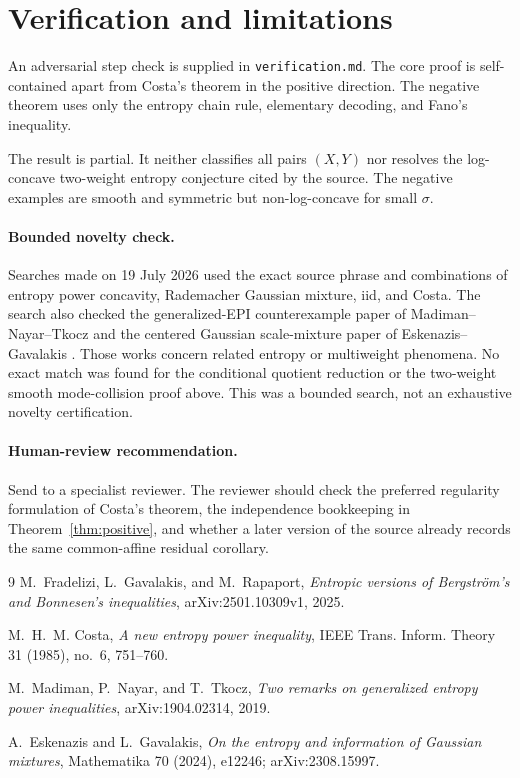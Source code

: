 \documentclass[11pt]{article}
\begin{document}
\section{Verification and limitations}

An adversarial step check is supplied in \texttt{verification.md}. The core
proof is self-contained apart from Costa's theorem in the positive direction.
The negative theorem uses only the entropy chain rule, elementary decoding,
and Fano's inequality.

The result is partial. It neither classifies all pairs $(X,Y)$ nor resolves
the log-concave two-weight entropy conjecture cited by the source. The
negative examples are smooth and symmetric but non-log-concave for small
$\sigma$.

\paragraph{Bounded novelty check.}
Searches made on 19 July 2026 used the exact source phrase and combinations of
entropy power concavity, Rademacher Gaussian mixture, iid, and Costa. The
search also checked the generalized-EPI counterexample paper of
Madiman--Nayar--Tkocz and the centered Gaussian scale-mixture paper of
Eskenazis--Gavalakis \cite{MNT,EG}. Those works concern related entropy or
multiweight phenomena. No exact match was found for the conditional quotient
reduction or the two-weight smooth mode-collision proof above. This was a
bounded search, not an exhaustive novelty certification.

\paragraph{Human-review recommendation.}
Send to a specialist reviewer. The reviewer should check the preferred
regularity formulation of Costa's theorem, the independence bookkeeping in
Theorem~\ref{thm:positive}, and whether a later version of the source already
records the same common-affine residual corollary.

\small
\begin{thebibliography}{9}
M.~Fradelizi, L.~Gavalakis, and M.~Rapaport,
\emph{Entropic versions of Bergstr\"om's and Bonnesen's inequalities},
arXiv:2501.10309v1, 2025.

M.~H.~M. Costa,
\emph{A new entropy power inequality},
IEEE Trans. Inform. Theory 31 (1985), no.~6, 751--760.

M.~Madiman, P.~Nayar, and T.~Tkocz,
\emph{Two remarks on generalized entropy power inequalities},
arXiv:1904.02314, 2019.

A.~Eskenazis and L.~Gavalakis,
\emph{On the entropy and information of Gaussian mixtures},
Mathematika 70 (2024), e12246; arXiv:2308.15997.
\end{thebibliography}
\end{document}
